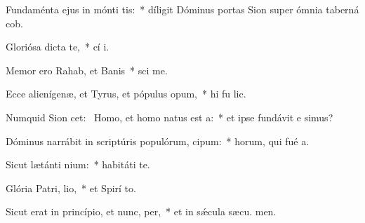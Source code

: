 \item Fundaménta ejus in mónti tis:~* díligit Dóminus portas Sion super ómnia taberná cob.
\item Gloriósa dicta   te,~* cí i.
\item Memor ero Rahab, et Banis~* sci me.
\item Ecce alienígenæ, et Tyrus, et pópulus opum,~* hi fu lic.
\item Numquid Sion cet:~\pscross{} Homo, et homo natus est  a:~* et ipse fundávit e simus?
\item Dóminus narrábit in scriptúris populórum,  cipum:~* horum, qui fué  a.
\item Sicut lætánti nium:~* habitáti   te.
\item Glória Patri,  lio,~* et Spirí to.
\item Sicut erat in princípio, et nunc,  per,~* et in sǽcula sæcu. men.
